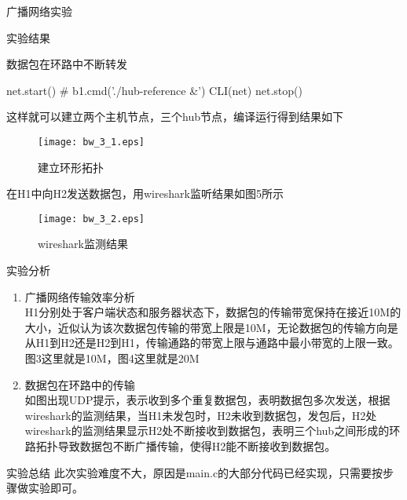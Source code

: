 \documentclass{article} %
\begin{document}
\begin{section}{广播网络实验}
\begin{subsection}{实验结果}
\begin{subsubsection}{数据包在环路中不断转发}
\begin{python}
net.start()
# b1.cmd('./hub-reference &')
CLI(net)
net.stop()	
		\end{python}
	这样就可以建立两个主机节点，三个hub节点，编译运行得到结果如下
		\begin{figure}[h]	
			\centering
			\texttt{[image: bw\_3\_1.eps]}	
			\caption{建立环形拓扑}
		\end{figure}
	在H1中向H2发送数据包，用wireshark监听结果如图5所示
			\begin{figure}[h]	
			\centering
			\texttt{[image: bw\_3\_2.eps]}	
			\caption{wireshark监测结果}
		\end{figure}
	\end{subsubsection}
		\end{subsection}
		\begin{subsection}{实验分析}
			\begin{enumerate}[1)]
				\item 广播网络传输效率分析\\
				H1分别处于客户端状态和服务器状态下，数据包的传输带宽保持在接近10M的大小，近似认为该次数据包传输的带宽上限是10M，无论数据包的传输方向是从H1到H2还是H2到H1，传输通路的带宽上限与通路中最小带宽的上限一致。图3这里就是10M，图4这里就是20M
				\item 数据包在环路中的传输\\
				如图出现UDP提示，表示收到多个重复数据包，表明数据包多次发送，根据wireshark的监测结果，当H1未发包时，H2未收到数据包，发包后，H2处wireshark的监测结果显示H2处不断接收到数据包，表明三个hub之间形成的环路拓扑导致数据包不断广播传输，使得H2能不断接收到数据包。
			\end{enumerate}
		\end{subsection}
		\begin{subsection}{实验总结}
			此次实验难度不大，原因是main.c的大部分代码已经实现，只需要按步骤做实验即可。
		\end{subsection}
	\end{section}
\end{document}
